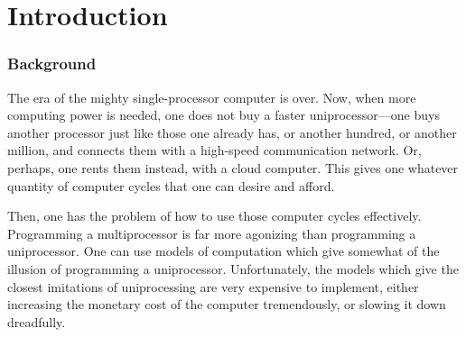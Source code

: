 \chapter{Introduction}

\subsection*{Background}



The era of the mighty single-processor computer is over. Now, when more
computing power is needed, one does not buy a faster uniprocessor---one buys
another processor just like those one already has, or another hundred, or
another million, and connects them with a high-speed communication network.
Or, perhaps, one rents them instead, with a cloud computer. This gives one
whatever quantity of computer cycles that one can desire and afford.

Then, one has the problem of how to use those computer cycles effectively.
Programming a multiprocessor is far more agonizing than programming a
uniprocessor.   One can use models of computation which give somewhat of the
illusion of programming a uniprocessor.  Unfortunately, the models which give
the closest imitations of uniprocessing are very expensive to implement,
either increasing the monetary cost of the computer tremendously, or slowing
it down dreadfully. 

